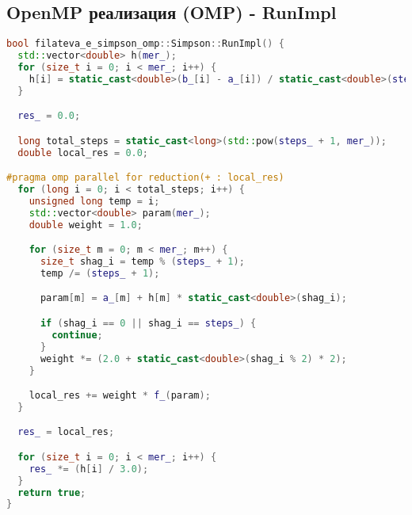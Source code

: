 \documentclass[12pt]{article}
\begin{document}
\subsection{OpenMP реализация (OMP) - RunImpl}
\begin{lstlisting}[language=C++]
bool filateva_e_simpson_omp::Simpson::RunImpl() {
  std::vector<double> h(mer_);
  for (size_t i = 0; i < mer_; i++) {
    h[i] = static_cast<double>(b_[i] - a_[i]) / static_cast<double>(steps_);
  }

  res_ = 0.0;

  long total_steps = static_cast<long>(std::pow(steps_ + 1, mer_));
  double local_res = 0.0;

#pragma omp parallel for reduction(+ : local_res)
  for (long i = 0; i < total_steps; i++) {
    unsigned long temp = i;
    std::vector<double> param(mer_);
    double weight = 1.0;

    for (size_t m = 0; m < mer_; m++) {
      size_t shag_i = temp % (steps_ + 1);
      temp /= (steps_ + 1);

      param[m] = a_[m] + h[m] * static_cast<double>(shag_i);

      if (shag_i == 0 || shag_i == steps_) {
        continue;
      }
      weight *= (2.0 + static_cast<double>(shag_i % 2) * 2);
    }

    local_res += weight * f_(param);
  }

  res_ = local_res;

  for (size_t i = 0; i < mer_; i++) {
    res_ *= (h[i] / 3.0);
  }
  return true;
}

\end{lstlisting}
\newpage
\end{document}
